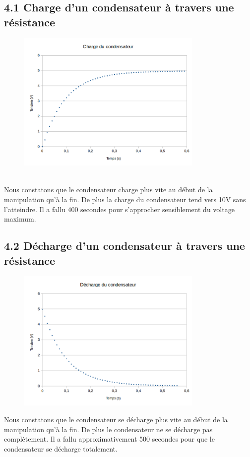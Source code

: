 \documentclass{report}
\begin{document}
\subsection*{4.1 Charge d'un condensateur \`a travers une r\'esistance}
\hspace*{0.5cm}
\begin{figure}[ht!]
\centering
\includegraphics[width=90mm]{charge.png}
\label{overflow}
\end{figure}
\\
\hspace*{0.5cm}
Nous constatons que le condensateur charge plus vite au d\'ebut de la manipulation qu'\`a la fin. De plus la charge du condensateur tend vers 10V sans l'atteindre. Il a fallu 400 secondes pour s'approcher sensiblement du voltage maximum.
\pagebreak
\subsection*{4.2 D\'echarge d'un condensateur \`a travers une r\'esistance}
\begin{figure}[ht!]
\centering
\includegraphics[width=90mm]{decharge.png}
\label{overflow}
\end{figure}
\hspace*{0.5cm}
Nous constatons que le condensateur se d\'echarge plus vite au d\'ebut de la manipulation qu'\`a la fin. De plus le condensateur ne se d\'echarge pas compl\`etement. Il a fallu approximativement 500 secondes pour que le condensateur se d\'echarge totalement.
\pagebreak
\end{document}
